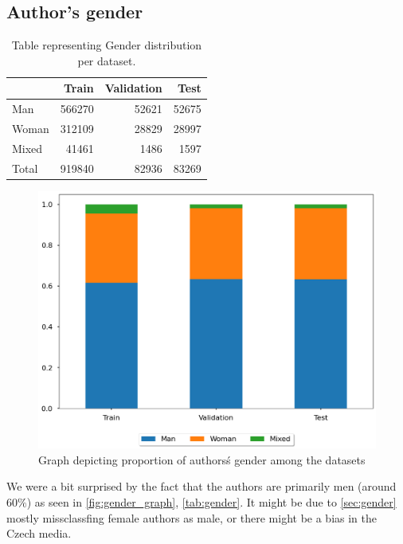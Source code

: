 \subsection{Author's gender}
\begin{table}[h]
    \centering\footnotesize\sf
    \begin{tabular}{lrrr}
        \toprule
        {}    & Train  & Validation & Test  \\
        \midrule
        Man   & 566270 & 52621      & 52675 \\
        Woman & 312109 & 28829      & 28997 \\
        Mixed & 41461  & 1486       & 1597  \\
        \midrule
        Total & 919840 & 82936      & 83269 \\
        \bottomrule
    \end{tabular}
    \caption{Table representing Gender distribution per dataset.}
    \label{tab:gender}
\end{table}
\begin{figure}[h]
    \centering
    \includegraphics[width=.6\linewidth]{img/tasks_graph/authors_cum_gender.png}
    \caption{Graph depicting proportion of authors\'s gender among the datasets}
    \label{fig:gender_graph}
\end{figure}
We were a bit surprised by the fact that the authors are primarily men (around $60\%$) as seen in \autoref{fig:gender_graph}, \autoref{tab:gender}.
It might be due to \autoref{sec:gender} mostly missclassfing female authors as male, or there might be a bias in the Czech media. 
